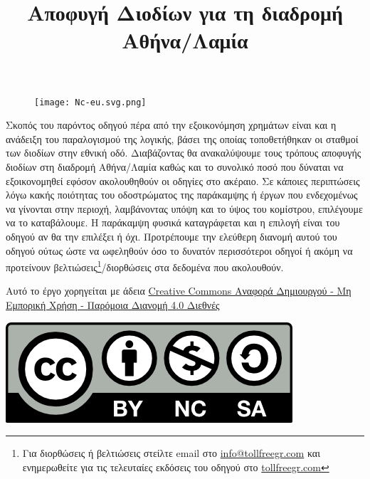 \documentclass[a4paper,12pt]{article}
\title{\LARGE Αποφυγή Διοδίων για τη διαδρομή Αθήνα/Λαμία}
\date{}
\author{}
\begin{document}
\begin{titlepage}


\maketitle
\begin{figure}[hbp!]
	\centering
		\texttt{[image: Nc-eu.svg.png]}
\end{figure}
\abstract Σκοπός του παρόντος οδηγού πέρα από την εξοικονόμηση χρημάτων είναι και η ανάδειξη του παραλογισμού της λογικής, βάσει της οποίας τοποθετήθηκαν οι σταθμοί των διοδίων στην εθνική οδό. Διαβάζοντας θα ανακαλύψουμε τους τρόπους αποφυγής διοδίων στη διαδρομή Αθήνα/Λαμία καθώς και το συνολικό ποσό που δύναται να εξοικονομηθεί εφόσον ακολουθηθούν οι οδηγίες στο ακέραιο. Σε κάποιες περιπτώσεις λόγω κακής ποιότητας του οδοστρώματος της παράκαμψης ή έργων που ενδεχομένως να γίνονται στην περιοχή, λαμβάνοντας υπόψη και το ύψος του κομίστρου, επιλέγουμε να το καταβάλουμε. Η παράκαμψη φυσικά καταγράφεται και η επιλογή είναι του οδηγού αν θα την επιλέξει ή όχι. Προτρέπουμε την ελεύθερη διανομή αυτού του οδηγού ούτως ώστε να ωφεληθούν όσο το δυνατόν περισσότεροι οδηγοί ή ακόμη να προτείνουν βελτιώσεις\footnote{Για διορθώσεις ή βελτιώσεις στείλτε email στο \href{mailto:info@tollfreegr.com}{info@tollfreegr.com} και ενημερωθείτε για τις τελευταίες εκδόσεις του οδηγού στο \href{https://tollfreegr.com}{tollfreegr.com}}/διορθώσεις στα δεδομένα που ακολουθούν. 

\vspace{1.5cm}
\begin{center}
\begin{footnotesize}
{Αυτό το έργο χορηγείται με άδεια \href{http://creativecommons.org/licenses/by-nc-sa/4.0/}{Creative Commons Αναφορά Δημιουργού - Μη Εμπορική Χρήση - Παρόμοια Διανομή 4.0 Διεθνές}

\includegraphics[scale=0.5]{by-nc-sa.png}}
\end{footnotesize}
\end{center}

\thispagestyle{empty}
\end{titlepage}
\tableofcontents
\newpage


\end{document}
